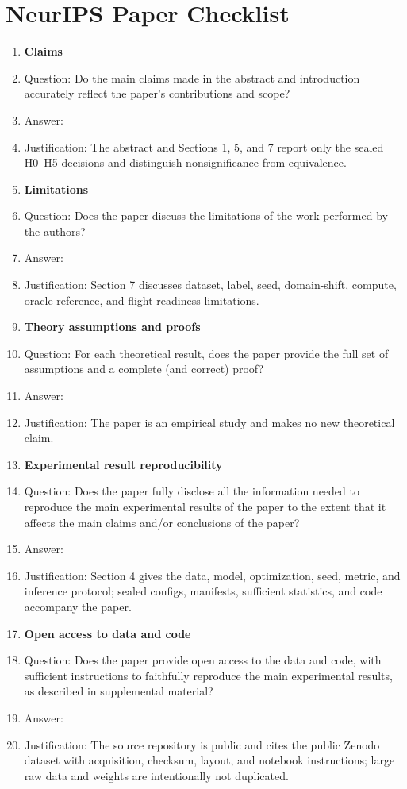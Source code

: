 \section*{NeurIPS Paper Checklist}

\begin{enumerate}

\item \textbf{Claims}
  \item[] Question: Do the main claims made in the abstract and introduction accurately reflect the paper's contributions and scope?
  \item[] Answer: \answerYes{}
  \item[] Justification: The abstract and Sections 1, 5, and 7 report only the sealed H0--H5 decisions and distinguish nonsignificance from equivalence.

\item \textbf{Limitations}
  \item[] Question: Does the paper discuss the limitations of the work performed by the authors?
  \item[] Answer: \answerYes{}
  \item[] Justification: Section 7 discusses dataset, label, seed, domain-shift, compute, oracle-reference, and flight-readiness limitations.

\item \textbf{Theory assumptions and proofs}
  \item[] Question: For each theoretical result, does the paper provide the full set of assumptions and a complete (and correct) proof?
  \item[] Answer: \answerNA{}
  \item[] Justification: The paper is an empirical study and makes no new theoretical claim.

\item \textbf{Experimental result reproducibility}
  \item[] Question: Does the paper fully disclose all the information needed to reproduce the main experimental results of the paper to the extent that it affects the main claims and/or conclusions of the paper?
  \item[] Answer: \answerYes{}
  \item[] Justification: Section 4 gives the data, model, optimization, seed, metric, and inference protocol; sealed configs, manifests, sufficient statistics, and code accompany the paper.

\item \textbf{Open access to data and code}
  \item[] Question: Does the paper provide open access to the data and code, with sufficient instructions to faithfully reproduce the main experimental results, as described in supplemental material?
  \item[] Answer: \answerYes{}
  \item[] Justification: The source repository is public and cites the public Zenodo dataset with acquisition, checksum, layout, and notebook instructions; large raw data and weights are intentionally not duplicated.


\end{enumerate}

